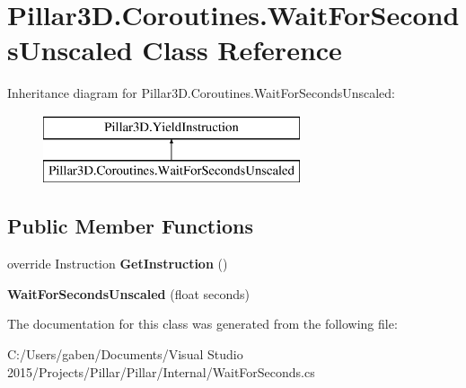\hypertarget{class_pillar3_d_1_1_coroutines_1_1_wait_for_seconds_unscaled}{}\section{Pillar3\+D.\+Coroutines.\+Wait\+For\+Seconds\+Unscaled Class Reference}
\label{class_pillar3_d_1_1_coroutines_1_1_wait_for_seconds_unscaled}
Inheritance diagram for Pillar3\+D.\+Coroutines.\+Wait\+For\+Seconds\+Unscaled\+:\begin{figure}[H]
\begin{center}
\leavevmode
\includegraphics[height=2.000000cm]{class_pillar3_d_1_1_coroutines_1_1_wait_for_seconds_unscaled}
\end{center}
\end{figure}
\subsection*{Public Member Functions}
\begin{DoxyCompactItemize}
\item 
\mbox{\label{class_pillar3_d_1_1_coroutines_1_1_wait_for_seconds_unscaled_aa119ae1160297b5d8541f95c9831315f}} 
override Instruction {\bfseries Get\+Instruction} ()
\item 
\mbox{\label{class_pillar3_d_1_1_coroutines_1_1_wait_for_seconds_unscaled_af52b3d2728cdf7f1039c1e101dbf0c9d}} 
{\bfseries Wait\+For\+Seconds\+Unscaled} (float seconds)
\end{DoxyCompactItemize}


The documentation for this class was generated from the following file\+:\begin{DoxyCompactItemize}
\item 
C\+:/\+Users/gaben/\+Documents/\+Visual Studio 2015/\+Projects/\+Pillar/\+Pillar/\+Internal/Wait\+For\+Seconds.\+cs\end{DoxyCompactItemize}
